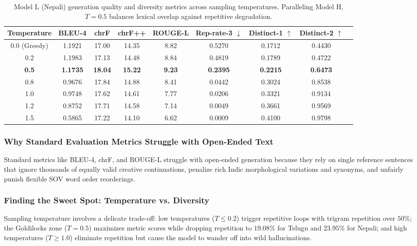 \documentclass[8pt]{article}
\begin{document}
\begin{table}[H]
    \centering
    \small
    \setlength{\tabcolsep}{4.8pt}
    \begin{tabular}{ccccccccc}
        \toprule
        \textbf{Temperature} & \textbf{BLEU-4} & \textbf{chrF} & \textbf{chrF++} & \textbf{ROUGE-L} & \textbf{Rep-rate-3} $\downarrow$ & \textbf{Distinct-1} $\uparrow$ & \textbf{Distinct-2} $\uparrow$ \\
        \midrule
        0.0 (Greedy) & 1.1921 & 17.00 & 14.35 & 8.82 & 0.5270 & 0.1712 & 0.4430 \\
        0.2 & 1.1983 & 17.13 & 14.48 & 8.84 & 0.4819 & 0.1789 & 0.4722 \\
        \textbf{0.5} & \textbf{1.1735} & \textbf{18.04} & \textbf{15.22} & \textbf{9.23} & \textbf{0.2395} & \textbf{0.2215} & \textbf{0.6473} \\
        0.8 & 0.9676 & 17.84 & 14.88 & 8.41 & 0.0442 & 0.3024 & 0.8538 \\
        1.0 & 0.9748 & 17.62 & 14.61 & 7.77 & 0.0206 & 0.3321 & 0.9134 \\
        1.2 & 0.8752 & 17.71 & 14.58 & 7.14 & 0.0049 & 0.3661 & 0.9569 \\
        1.5 & 0.5865 & 17.22 & 14.10 & 6.62 & 0.0009 & 0.4100 & 0.9798 \\
        \bottomrule
    \end{tabular}
    \caption{Model L (Nepali) generation quality and diversity metrics across sampling temperatures. Paralleling Model H, $T = 0.5$ balances lexical overlap against repetitive degradation.}
    \label{tab:generation_model_L}
\end{table}


\subsubsection{Why Standard Evaluation Metrics Struggle with Open-Ended Text}
Standard metrics like BLEU-4, chrF, and ROUGE-L struggle with open-ended generation because they rely on single reference sentences that ignore thousands of equally valid creative continuations, penalize rich Indic morphological variations and synonyms, and unfairly punish flexible SOV word order reorderings.

\subsubsection{Finding the Sweet Spot: Temperature vs. Diversity}
Sampling temperature involves a delicate trade-off: low temperatures ($T \le 0.2$) trigger repetitive loops with trigram repetition over $50\%$; the Goldilocks zone ($T = 0.5$) maximizes metric scores while dropping repetition to $19.08\%$ for Telugu and $23.95\%$ for Nepali; and high temperatures ($T \ge 1.0$) eliminate repetition but cause the model to wander off into wild hallucinations.
\end{document}
